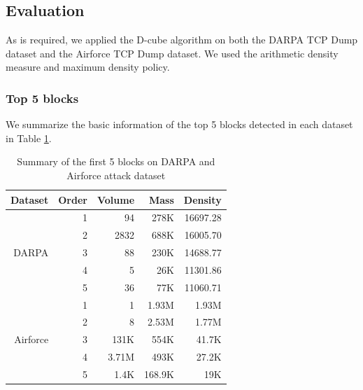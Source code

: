 \subsection{Evaluation}
As is required, we applied the D-cube algorithm on both the DARPA TCP Dump dataset and the Airforce TCP Dump dataset. We used the arithmetic density measure and maximum density policy.

\subsubsection{Top 5 blocks}
We summarize the basic information of the top 5 blocks detected in each dataset in Table \ref{table: k5_2}.

\begin{table}[htbp]
\centering
\caption{Summary of the first 5 blocks on DARPA and Airforce attack dataset}
\label{table: k5_2}
\begin{tabular}{rrrrr}
\hline
Dataset                                                                                    & Order                  & Volume & Mass   & Density  \\ \hline
\multirow{5}{*}{DARPA}                                                                     & \multicolumn{1}{r|}{1} & 94     & 278K   & 16697.28 \\
                                                                                           & \multicolumn{1}{r|}{2} & 2832   & 688K   & 16005.70 \\
                                                                                           & \multicolumn{1}{r|}{3} & 88     & 230K   & 14688.77 \\
                                                                                           & \multicolumn{1}{r|}{4} & 5      & 26K    & 11301.86 \\
                                                                                           & \multicolumn{1}{r|}{5} & 36     & 77K    & 11060.71 \\ \hline
\multirow{5}{*}{Airforce}                                                                  & \multicolumn{1}{r|}{1} & 1      & 1.93M  & 1.93M    \\
                                                                                           & \multicolumn{1}{r|}{2} & 8      & 2.53M  & 1.77M    \\
                                                                                           & \multicolumn{1}{r|}{3} & 131K   & 554K   & 41.7K    \\
                                                                                           & \multicolumn{1}{r|}{4} & 3.71M  & 493K   & 27.2K    \\
                                                                                           & \multicolumn{1}{r|}{5} & 1.4K   & 168.9K & 19K      \\ \hline
\end{tabular}
\end{table}


